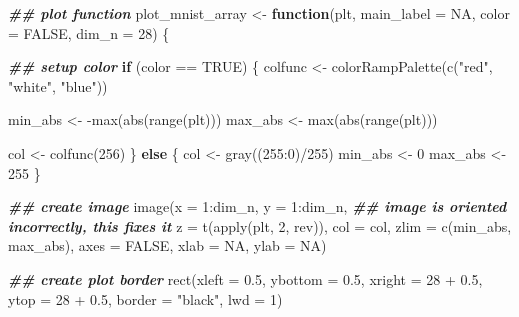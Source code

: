 \documentclass[
]{book}
\newenvironment{Shaded}{\begin{snugshade}}{\end{snugshade}}
\newcommand{\AttributeTok}[1]{\textcolor[rgb]{0.77,0.63,0.00}{#1}}
\newcommand{\ConstantTok}[1]{\textcolor[rgb]{0.00,0.00,0.00}{#1}}
\newcommand{\ControlFlowTok}[1]{\textcolor[rgb]{0.13,0.29,0.53}{\textbf{#1}}}
\newcommand{\DecValTok}[1]{\textcolor[rgb]{0.00,0.00,0.81}{#1}}
\newcommand{\DocumentationTok}[1]{\textcolor[rgb]{0.56,0.35,0.01}{\textbf{\textit{#1}}}}
\newcommand{\FloatTok}[1]{\textcolor[rgb]{0.00,0.00,0.81}{#1}}
\newcommand{\FunctionTok}[1]{\textcolor[rgb]{0.00,0.00,0.00}{#1}}
\newcommand{\NormalTok}[1]{#1}
\newcommand{\OtherTok}[1]{\textcolor[rgb]{0.56,0.35,0.01}{#1}}
\newcommand{\SpecialCharTok}[1]{\textcolor[rgb]{0.00,0.00,0.00}{#1}}
\newcommand{\StringTok}[1]{\textcolor[rgb]{0.31,0.60,0.02}{#1}}
\begin{document}
\begin{Shaded}
\begin{Highlighting}[]
\DocumentationTok{\#\# plot function}
\NormalTok{plot\_mnist\_array }\OtherTok{\textless{}{-}} \ControlFlowTok{function}\NormalTok{(plt, }\AttributeTok{main\_label =} \ConstantTok{NA}\NormalTok{, }\AttributeTok{color =} \ConstantTok{FALSE}\NormalTok{, }\AttributeTok{dim\_n =} \DecValTok{28}\NormalTok{) \{}
  
  \DocumentationTok{\#\# setup color}
  \ControlFlowTok{if}\NormalTok{ (color }\SpecialCharTok{==} \ConstantTok{TRUE}\NormalTok{) \{}
\NormalTok{      colfunc }\OtherTok{\textless{}{-}} \FunctionTok{colorRampPalette}\NormalTok{(}\FunctionTok{c}\NormalTok{(}\StringTok{"red"}\NormalTok{, }\StringTok{"white"}\NormalTok{, }\StringTok{"blue"}\NormalTok{))}
      
\NormalTok{      min\_abs }\OtherTok{\textless{}{-}} \SpecialCharTok{{-}}\FunctionTok{max}\NormalTok{(}\FunctionTok{abs}\NormalTok{(}\FunctionTok{range}\NormalTok{(plt)))}
\NormalTok{      max\_abs }\OtherTok{\textless{}{-}} \FunctionTok{max}\NormalTok{(}\FunctionTok{abs}\NormalTok{(}\FunctionTok{range}\NormalTok{(plt)))}
      
\NormalTok{      col }\OtherTok{\textless{}{-}} \FunctionTok{colfunc}\NormalTok{(}\DecValTok{256}\NormalTok{)}
\NormalTok{  \} }\ControlFlowTok{else}\NormalTok{ \{}
\NormalTok{    col }\OtherTok{\textless{}{-}} \FunctionTok{gray}\NormalTok{((}\DecValTok{255}\SpecialCharTok{:}\DecValTok{0}\NormalTok{)}\SpecialCharTok{/}\DecValTok{255}\NormalTok{)}
\NormalTok{    min\_abs }\OtherTok{\textless{}{-}} \DecValTok{0}
\NormalTok{    max\_abs }\OtherTok{\textless{}{-}} \DecValTok{255}
\NormalTok{    \}}
  
  \DocumentationTok{\#\# create image}
  \FunctionTok{image}\NormalTok{(}\AttributeTok{x =} \DecValTok{1}\SpecialCharTok{:}\NormalTok{dim\_n,}
        \AttributeTok{y =} \DecValTok{1}\SpecialCharTok{:}\NormalTok{dim\_n,}
        \DocumentationTok{\#\# image is oriented incorrectly, this fixes it}
        \AttributeTok{z =} \FunctionTok{t}\NormalTok{(}\FunctionTok{apply}\NormalTok{(plt, }\DecValTok{2}\NormalTok{, rev)),}
        \AttributeTok{col =}\NormalTok{ col,}
        \AttributeTok{zlim =} \FunctionTok{c}\NormalTok{(min\_abs, max\_abs),}
        \AttributeTok{axes =} \ConstantTok{FALSE}\NormalTok{,}
        \AttributeTok{xlab =} \ConstantTok{NA}\NormalTok{,}
        \AttributeTok{ylab =} \ConstantTok{NA}\NormalTok{)}
  
  \DocumentationTok{\#\# create plot border}
  \FunctionTok{rect}\NormalTok{(}\AttributeTok{xleft =} \FloatTok{0.5}\NormalTok{,}
       \AttributeTok{ybottom =} \FloatTok{0.5}\NormalTok{,}
       \AttributeTok{xright =} \DecValTok{28} \SpecialCharTok{+} \FloatTok{0.5}\NormalTok{,}
       \AttributeTok{ytop =} \DecValTok{28} \SpecialCharTok{+} \FloatTok{0.5}\NormalTok{,}
       \AttributeTok{border =} \StringTok{"black"}\NormalTok{,}
       \AttributeTok{lwd =} \DecValTok{1}\NormalTok{)}
  

\end{Highlighting}
\end{Shaded}
\end{document}
